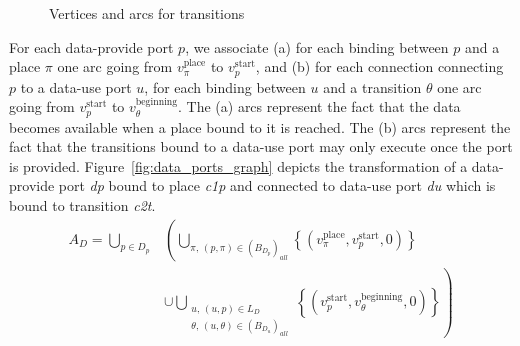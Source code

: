 \begin{figure}[h]
{\begin{minipage}[c]{1.2\columnwidth}
    \end{minipage}
  }
  \caption{Vertices and arcs for transitions}
  \label{fig:transition_graph}
\end{figure}

For each data-provide port $p$, we associate (a) for each binding between
$p$ and a place $\pi$ one arc going from $v_\pi^\text{place}$ to
$v_p^\text{start}$, and (b) for each connection connecting $p$
to a data-use port $u$, for each binding between $u$ and a transition
$\theta$ one arc going from $v_p^\text{start}$ to $v_\theta^\text{beginning}$.
The (a) arcs represent the fact that the data becomes
available when a place bound to it is reached. The (b) arcs represent the
fact that the transitions bound to a data-use port may only execute once
the port is provided.
Figure~\ref{fig:data_ports_graph} depicts the transformation of a
data-provide port \emph{dp} bound to place \emph{c1p} and connected to
data-use port \emph{du} which is bound to transition \emph{c2t}.
\begin{align*}
A_{D}=\bigcup_{p\in D_p}
& \left(\bigcup_{\pi,\,\left(p,\pi\right)\in\left(B_{D_{p}}\right)_{all}}\left\{ \left(v_\pi^\text{place},v_p^\text{start},0\right)\right\}\right. \\
& \left.\cup\bigcup_{\substack{u,\,\left(u,p\right)\in L_D \\ \theta,\,\left(u,\theta\right)\in\left(B_{D_{u}}\right)_{all}}}\left\{ \left(v_p^\text{start},v_\theta^\text{beginning},0\right)\right\}\right)
\end{align*}

